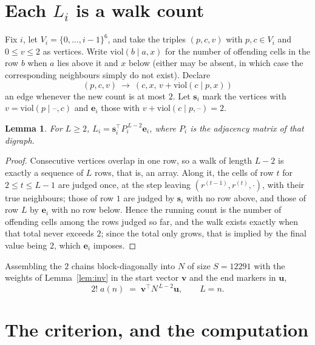 \documentclass[11pt,a4paper]{article}
\theoremstyle{plain}
\newtheorem{lemma}[theorem]{Lemma}
\theoremstyle{definition}
\begin{document}
\section{Each $L_i$ is a walk count}

Fix $i$, let $V_i=\{0,\dots,i-1\}^{6}$, and take the triples $(p,c,v)$ with
$p,c\in V_i$ and $0\le v\le2$ as vertices. Write $\mathrm{viol}(b\mid a,x)$ for the number
of offending cells in the row $b$ when $a$ lies above it and $x$ below (either may be
absent, in which case the corresponding neighbours simply do not exist). Declare
\[
(p,c,v)\ \longrightarrow\ (c,x,\,v+\mathrm{viol}(c\mid p,x))
\]
an edge whenever the new count is at most $2$. Let $\mathbf{s}_i$ mark the vertices with
$v=\mathrm{viol}(p\mid\text{--},c)$ and $\mathbf{e}_i$ those with
$v+\mathrm{viol}(c\mid p,\text{--})=2$.

\begin{lemma}\label{lem:walk}
For $L\ge2$, $L_i=\mathbf{s}_i^{\!\top}P_i^{\,L-2}\mathbf{e}_i$, where $P_i$ is the
adjacency matrix of that digraph.
\end{lemma}

\begin{proof}
Consecutive vertices overlap in one row, so a walk of length $L-2$ is exactly a sequence
of $L$ rows, that is, an array. Along it, the cells of row $t$ for $2\le t\le L-1$ are
judged once, at the step leaving $(r^{(t-1)},r^{(t)},\cdot)$, with their true neighbours;
those of row $1$ are judged by $\mathbf{s}_i$ with no row above, and those of row
$L$ by $\mathbf{e}_i$ with no row below. Hence the running count is the number of
offending cells among the rows judged so far, and the walk exists exactly when that total
never exceeds $2$; since the total only grows, that is implied by the final value being
$2$, which $\mathbf{e}_i$ imposes.
\end{proof}

Assembling the $2$ chains block-diagonally into $N$ of size $S=12291$ with the weights of
Lemma~\ref{lem:inv} in the start vector $\mathbf{v}$ and the end markers in
$\mathbf{u}$,
\begin{equation}\label{eq:walk2}
2!\;a(n)\;=\;\mathbf{v}^{\!\top}N^{\,L-2}\mathbf{u},\qquad L=n .
\end{equation}

\section{The criterion, and the computation}
\end{document}
